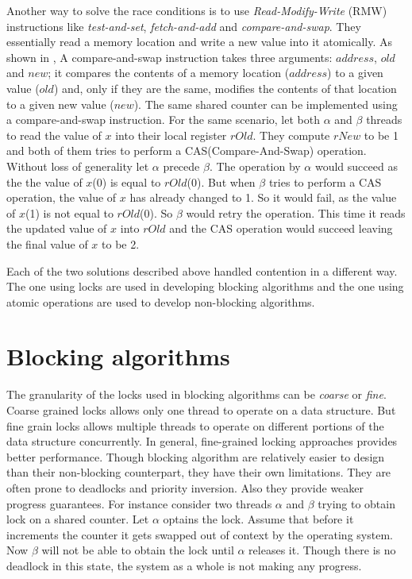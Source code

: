 Another way to solve the race conditions is to use \emph{Read-Modify-Write} (RMW) instructions like \emph{test-and-set}, \emph{fetch-and-add} and \emph{compare-and-swap}. They essentially read a memory location and write a new value into it atomically. As shown in , A compare-and-swap  instruction takes three arguments: $address$, $old$ and $new$; it compares the contents of a memory location ($address$) to a given value ($old$) and, only if they are the same, modifies the contents of that location to a given new value ($new$). The same shared counter can be implemented using a compare-and-swap instruction. For the same scenario, let both $\alpha$ and $\beta$ threads to read the value of $x$ into their local register $rOld$. They compute $rNew$ to be 1 and both of them tries to perform a CAS(Compare-And-Swap) operation. Without loss of generality let $\alpha$ precede $\beta$. The operation by $\alpha$ would succeed as the the value of $x$(0) is equal to $rOld$(0). But when $\beta$ tries to perform a CAS operation, the value of $x$ has already changed to 1. So it would fail, as the value of $x$(1) is not equal to $rOld$(0). So $\beta$ would retry the operation. This time it reads the updated value of $x$ into $rOld$ and the CAS operation would succeed leaving the final value of $x$ to be 2.

Each of the two solutions described above handled contention in a different way. The one using locks are used in developing blocking algorithms and the one using atomic operations are used to develop non-blocking algorithms.

\section{Blocking algorithms}
The granularity of the locks used in blocking algorithms can be \emph{coarse} or \emph{fine}. Coarse grained locks allows only one thread to operate on a data structure. But fine grain locks allows multiple threads to operate on different portions of the data structure concurrently. In general, fine-grained locking approaches provides better performance. Though blocking algorithm are relatively easier to design than their non-blocking counterpart, they have their own limitations. They are often prone to deadlocks and priority inversion. Also they provide weaker progress guarantees. For instance consider two threads $\alpha$ and $\beta$ trying to obtain lock on a shared counter. Let $\alpha$ optains the lock. Assume that before it increments the counter it gets swapped out of context by the operating system. Now $\beta$ will not be able to obtain the lock until $\alpha$ releases it. Though there is no deadlock in this state, the system as a whole is not making any progress.


